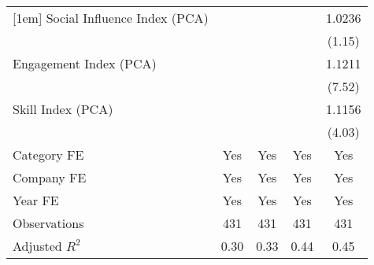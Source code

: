 {\begin{tabular}{l*{4}{c}}
[1em]
Social Influence Index (PCA)       &                     &                     &                     &      1.0236         \\
                                   &                     &                     &                     &      (1.15)         \\
[1em]
Engagement Index (PCA)             &                     &                     &                     &      1.1211\sym{***}\\
                                   &                     &                     &                     &      (7.52)         \\
[1em]
Skill Index (PCA)                  &                     &                     &                     &      1.1156\sym{***}\\
                                   &                     &                     &                     &      (4.03)         \\
[1em]
Category FE                        &         Yes         &         Yes         &         Yes         &         Yes         \\
[1em]
Company FE                         &         Yes         &         Yes         &         Yes         &         Yes         \\
[1em]
Year FE                            &         Yes         &         Yes         &         Yes         &         Yes         \\
\hline
Observations                       &         431         &         431         &         431         &         431         \\
Adjusted \(R^{2}\)                 &        0.30         &        0.33         &        0.44         &        0.45         \\
\hline\hline
\end{tabular}
}
